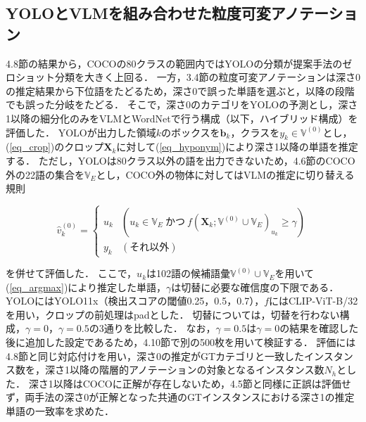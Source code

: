 \subsection{YOLOとVLMを組み合わせた粒度可変アノテーション}
4.8節の結果から，COCOの80クラスの範囲内ではYOLOの分類が提案手法のゼロショット分類を大きく上回る．
一方，3.4節の粒度可変アノテーションは深さ0の推定結果から下位語をたどるため，深さ0で誤った単語を選ぶと，以降の段階でも誤った分岐をたどる．
そこで，深さ0のカテゴリをYOLOの予測とし，深さ1以降の細分化のみをVLMとWordNetで行う構成（以下，ハイブリッド構成）を評価した．
YOLOが出力した領域$ k $のボックスを$ {\mathbf b}_k $，クラスを$ y_k \in {\mathbb V}^{(0)} $とし，(\ref{eq_crop})のクロップ$ {\mathbf X}_k $に対して(\ref{eq_hyponym})により深さ1以降の単語を推定する．
ただし，YOLOは80クラス以外の語を出力できないため，4.6節のCOCO外の22語の集合を$ {\mathbb V}_E $とし，COCO外の物体に対してはVLMの推定に切り替える規則

\begin{equation}
    \hat{v}_k^{(0)} =
    \begin{cases}
        u_k & (u_k \in {\mathbb V}_E \ \text{かつ}\ f({\mathbf X}_k; {\mathbb V}^{(0)} \cup {\mathbb V}_E)_{u_k} \geq \gamma) \\
        y_k & (\text{それ以外})
    \end{cases}
    \label{eq_hybrid_switch}
\end{equation}

\noindent
を併せて評価した．
ここで，$ u_k $は102語の候補語彙$ {\mathbb V}^{(0)} \cup {\mathbb V}_E $を用いて(\ref{eq_argmax})により推定した単語，$ \gamma $は切替に必要な確信度の下限である．
YOLOにはYOLO11x（検出スコアの閾値0.25，0.5，0.7），$ f $にはCLIP-ViT-B/32を用い，クロップの前処理はpadとした．
切替については，切替を行わない構成，$ \gamma = 0 $，$ \gamma = 0.5 $の3通りを比較した．
なお，$ \gamma = 0.5 $は$ \gamma = 0 $の結果を確認した後に追加した設定であるため，4.10節で別の500枚を用いて検証する．
評価には4.8節と同じ対応付けを用い，深さ0の推定がGTカテゴリと一致したインスタンス数を，深さ1以降の階層的アノテーションの対象となるインスタンス数$ N_h $とした．
深さ1以降はCOCOに正解が存在しないため，4.5節と同様に正誤は評価せず，両手法の深さ0が正解となった共通のGTインスタンスにおける深さ1の推定単語の一致率を求めた．

